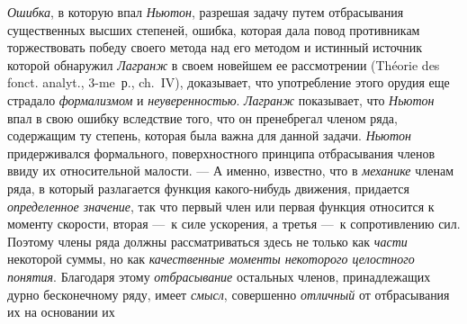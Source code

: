 {\em Ошибка}, в которую впал
{\em Ньютон}, разрешая задачу путем отбрасывания
существенных высших степеней, ошибка, которая дала повод противникам
торжествовать победу своего метода над его методом и истинный источник
которой обнаружил {\em Лагранж} в своем новейшем ее рассмотрении
(Théorie des fonct. analyt., 3-me~р., ch.~IV),
доказывает, что употребление этого орудия еще страдало
{\em формализмом} и {\em неуверенностью}. {\em Лагранж}
показывает, что {\em Ньютон} впал в свою ошибку
вследствие того, что он пренебрегал членом ряда, содержащим ту степень,
которая была важна для данной задачи. {\em Ньютон}
придерживался формального, поверхностного принципа отбрасывания членов
ввиду их относительной малости. — А именно, известно, что в
{\em механике} членам ряда, в который разлагается
функция какого-нибудь движения, придается
{\em определенное значение}, так что первый член или
первая функция относится к моменту скорости, вторая —~к силе ускорения, а
третья —~к сопротивлению сил. Поэтому члены ряда должны рассматриваться
здесь не только как {\em части} некоторой суммы, но как
{\em качественные моменты некоторого целостного
понятия}. Благодаря этому {\em отбрасывание} остальных
членов, принадлежащих дурно бесконечному ряду, имеет
{\em смысл}, совершенно
{\em отличный} от отбрасывания их на основании их
